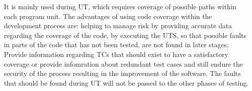 It is mainly used during \ac{UT}, which requires coverage of possible paths within each program unit.
The advantages of using code coverage within the development process are: helping to manage risk by providing accurate
data regarding the coverage of the code, by executing the \ac{UTS}, so that possible faults in parts of the code that has not been tested, are not found in later stages;
Provide information regarding \ac{TC}s that should exist to have a satisfactory coverage or provide infomration about redundant test cases
and still endure the security of the process resulting in the improvement of the software.
The faults that should be found during \ac{UT} will not be passed to the other phases of testing.\\

\cite{mcdc}
\cite{Marick99}
